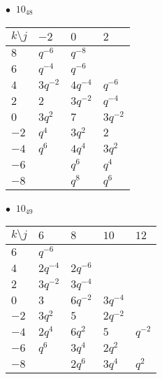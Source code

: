 \begin{minipage}{\linewidth}
$\bullet\ $ $10_{48}$ \vspace{0.5em} \\
\begin{tabular}{l|lll}
$k \setminus j$ & $-2$ & $0$ & $2$ \\
\hline
$8$ & $q^{-6}$ & $q^{-8}$ &  \\
$6$ & $q^{-4}$ & $q^{-6}$ &  \\
$4$ & $3q^{-2}$ & $4q^{-4}$ & $q^{-6}$ \\
$2$ & $2$ & $3q^{-2}$ & $q^{-4}$ \\
$0$ & $3q^{2}$ & $7$ & $3q^{-2}$ \\
$-2$ & $q^{4}$ & $3q^{2}$ & $2$ \\
$-4$ & $q^{6}$ & $4q^{4}$ & $3q^{2}$ \\
$-6$ &  & $q^{6}$ & $q^{4}$ \\
$-8$ &  & $q^{8}$ & $q^{6}$ \\
\end{tabular}
\vspace{2em}
\end{minipage}
%
\begin{minipage}{\linewidth}
$\bullet\ $ $10_{49}$ \vspace{0.5em} \\
\begin{tabular}{l|llll}
$k \setminus j$ & $6$ & $8$ & $10$ & $12$ \\
\hline
$6$ & $q^{-6}$ &  &  &  \\
$4$ & $2q^{-4}$ & $2q^{-6}$ &  &  \\
$2$ & $3q^{-2}$ & $3q^{-4}$ &  &  \\
$0$ & $3$ & $6q^{-2}$ & $3q^{-4}$ &  \\
$-2$ & $3q^{2}$ & $5$ & $2q^{-2}$ &  \\
$-4$ & $2q^{4}$ & $6q^{2}$ & $5$ & $q^{-2}$ \\
$-6$ & $q^{6}$ & $3q^{4}$ & $2q^{2}$ &  \\
$-8$ &  & $2q^{6}$ & $3q^{4}$ & $q^{2}$ \\
\end{tabular}
\vspace{2em}
\end{minipage}
%
